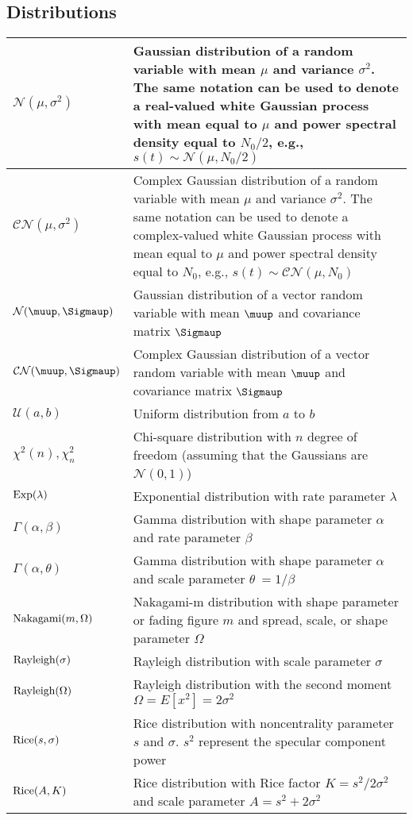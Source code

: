 \documentclass{article}
\begin{document}
\subsection{Distributions}
\begin{xltabular}{\textwidth}{XX}
    \(\mathcal{N}(\mu, \sigma^2)\) & Gaussian distribution of a random variable with mean \(\mu\) and variance \(\sigma^{2}\). The same notation can be used to denote a real-valued white Gaussian process with mean equal to \(\mu\) and power spectral density equal to \(N_0/2\), e.g., \(s(t) \sim \mathcal{N}(\mu, N_0/2)\)\\ \hline
    \(\mathcal{CN}(\mu, \sigma^2)\) & Complex Gaussian distribution of a random variable with mean \(\mu\) and variance \(\sigma^{2}\). The same notation can be used to denote a complex-valued white Gaussian process with mean equal to \(\mu\) and power spectral density equal to \(N_0\), e.g., \(s(t) \sim \mathcal{CN}(\mu, N_0)\)\\ \hline
    \(\mathcal{N}(\boldsymbol{\muup}, \boldsymbol{\Sigmaup})\) & Gaussian distribution of a vector random variable with mean \(\boldsymbol{\muup}\) and covariance matrix \(\boldsymbol{\Sigmaup}\)\\ \hline
    \(\mathcal{CN}(\boldsymbol{\muup}, \boldsymbol{\Sigmaup})\) & Complex Gaussian distribution of a vector random variable with mean \(\boldsymbol{\muup}\) and covariance matrix \(\boldsymbol{\Sigmaup}\)\\ \hline
    \(\mathcal{U}(a,b)\) & Uniform distribution from \(a\) to \(b\)\\ \hline
    \(\chi^2 (n), \chi^2_n\) & Chi-square distribution with \(n\) degree of freedom (assuming that the Gaussians are \(\mathcal{N}(0,1)\))\\ \hline
    \(\textnormal{Exp}(\lambda)\) & Exponential distribution with rate parameter \(\lambda\)\\ \hline
    \(\Gamma(\alpha, \beta)\) & Gamma distribution with shape parameter \(\alpha\) and rate parameter \(\beta\)\\ \hline
    \(\Gamma(\alpha, \theta)\) & Gamma distribution with shape parameter \(\alpha\) and scale parameter \(\theta\ = 1/\beta\)\\ \hline
    \(\textnormal{Nakagami}(m, \Omega)\) & Nakagami-m distribution with shape parameter or fading figure \(m\) and spread, scale, or shape parameter \(\Omega\) \\ \hline
    \(\textnormal{Rayleigh}(\sigma)\) & Rayleigh distribution with scale parameter \(\sigma\)\\ \hline
    \(\textnormal{Rayleigh}(\Omega)\) & Rayleigh distribution with the second moment \(\Omega = E\left[ x^2 \right] = 2\sigma^2\)\\ \hline
    \(\textnormal{Rice}(s, \sigma)\) & Rice distribution with noncentrality parameter \(s\) and \(\sigma\). \(s^2\) represent the specular component power\\ \hline
    \(\textnormal{Rice}(A, K)\) & Rice distribution with Rice factor \(K=s^2/2\sigma^2\) and scale parameter \(A = s^2 + 2\sigma^2\)
\end{xltabular}
\end{document}
